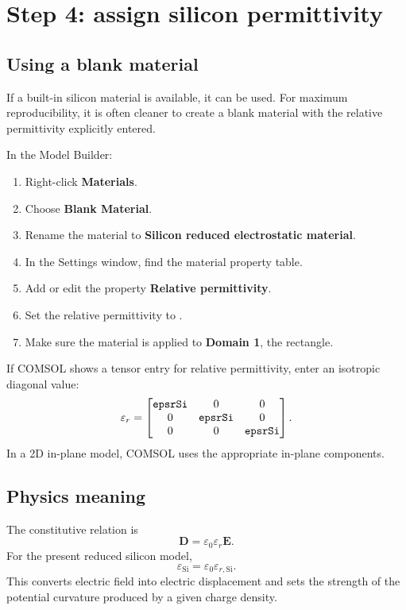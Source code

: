\documentclass[11pt]{article}
\newcommand{\Evec}{\mathbf{E}}
\newcommand{\Dvec}{\mathbf{D}}
\newcommand{\epss}{\varepsilon_{\mathrm{Si}}}
\newcommand{\code}[1]{\texttt{\detokenize{#1}}}
\begin{document}
\section{Step 4: assign silicon permittivity}

\subsection{Using a blank material}

If a built-in silicon material is available, it can be used. For maximum reproducibility, it is often cleaner to create a blank material with the relative permittivity explicitly entered.

In the Model Builder:
\begin{enumerate}[leftmargin=2em]
\item Right-click \textbf{Materials}.
\item Choose \textbf{Blank Material}.
\item Rename the material to \textbf{Silicon reduced electrostatic material}.
\item In the Settings window, find the material property table.
\item Add or edit the property \textbf{Relative permittivity}.
\item Set the relative permittivity to \code{epsrSi}.
\item Make sure the material is applied to \textbf{Domain 1}, the rectangle.
\end{enumerate}

If COMSOL shows a tensor entry for relative permittivity, enter an isotropic diagonal value:
\begin{equation}
\varepsilon_r=\begin{bmatrix} \code{epsrSi} & 0 & 0 \\ 0 & \code{epsrSi} & 0 \\ 0 & 0 & \code{epsrSi}\end{bmatrix}.
\end{equation}
In a 2D in-plane model, COMSOL uses the appropriate in-plane components.

\subsection{Physics meaning}

The constitutive relation is
\begin{equation}
\Dvec=\varepsilon_0\varepsilon_r\Evec.
\end{equation}
For the present reduced silicon model,
\begin{equation}
\epss=\varepsilon_0\varepsilon_{r,\mathrm{Si}}.
\end{equation}
This converts electric field into electric displacement and sets the strength of the potential curvature produced by a given charge density.
\end{document}
